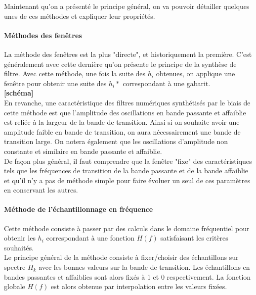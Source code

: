 \documentclass[11pt,a4paper]{article}
\begin{document}
Maintenant qu'on a présenté le principe général, on va pouvoir détailler quelques unes de ces méthodes et expliquer leur propriétés.

\paragraph{Méthodes des fenêtres} 
La méthode des fenêtres est la plus "directe", et historiquement la première. C'est généralement avec cette dernière  qu'on présente le principe de la synthèse de filtre. Avec cette méthode, une fois la suite des $h_i$ obtenues, on applique une fenêtre pour obtenir une suite des $h_i*$ correspondant à une gabarit.\\

\textbf{[schéma]}\\

En revanche, une caractéristique des filtres numériques synthétisés par le biais de cette méthode est que l'amplitude des oscillations en bande passante et affaiblie est reliée à la largeur de la bande de transition. Ainsi si on souhaite avoir une amplitude faible en bande de transition, on aura nécessairement une bande de transition large. On notera également que les oscillations d'amplitude non constante et similaire en bande passante et affaiblie.\\

De façon plus général, il faut comprendre que la fenêtre "fixe" des caractéristiques tels que les fréquences de transition de la bande passante et de la bande affaiblie et qu'il n'y a pas de méthode simple pour faire évoluer un seul de ces paramètres en conservant les autres.

\paragraph{Méthode de l'échantillonnage en fréquence}
Cette méthode consiste à passer par des calculs dans le domaine fréquentiel pour obtenir les $h_i$ correspondant à une fonction $H(f)$ satisfaisant les critères souhaités.\\

Le principe général de la méthode consiste à fixer/choisir des échantillons sur spectre $H_k$ avec les bonnes valeurs sur la bande de transition. Les échantillons en bandes passantes et affaiblies sont alors fixés à 1 et 0 respectivement. La fonction globale $H(f)$ est alors obtenue par interpolation entre les valeurs fixées.\\
\end{document}
